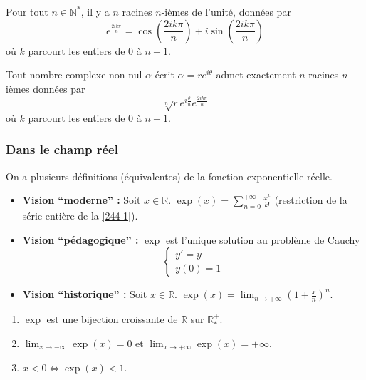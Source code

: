 
  \begin{application}
    Pour tout $n \in \mathbb{N}^*$, il y a $n$ racines $n$-ièmes de l'unité, données par
    \[ e^{\frac{2ik\pi}{n}} = \cos \left( \frac{2ik\pi}{n} \right) + i \sin \left( \frac{2ik\pi}{n} \right) \]
    où $k$ parcourt les entiers de $0$ à $n-1$.
  \end{application}

  \begin{corollary}
    Tout nombre complexe non nul $\alpha$ écrit $\alpha = re^{i\theta}$ admet exactement $n$ racines $n$-ièmes données par
    \[ \sqrt[n]{r} e^{i\frac{\theta}{n}} e^{\frac{2ik\pi}{n}} \]
    où $k$ parcourt les entiers de $0$ à $n-1$.
  \end{corollary}

  \subsubsection{Dans le champ réel}


  \begin{definition}
    On a plusieurs définitions (équivalentes) de la fonction exponentielle réelle.
    \begin{itemize}
      \item \textbf{Vision ``moderne'' :} Soit $x \in \mathbb{R}$. $\exp(x) = \sum_{n=0}^{+\infty} \frac{x^k}{k!}$ (restriction de la série entière de la \cref{244-1}).
      \item \textbf{Vision ``pédagogique'' :} $\exp$ est l'unique solution au problème de Cauchy
      \[
        \begin{cases}
          y' = y \\
          y(0) = 1
        \end{cases}
      \]
      \item \textbf{Vision ``historique'' :} Soit $x \in \mathbb{R}$. $\exp(x) = \lim_{n \rightarrow +\infty} \left( 1 + \frac{x}{n} \right)^n$.
    \end{itemize}
  \end{definition}


  \begin{theorem}
    \begin{enumerate}[label=(\roman*)]
      \item $\exp$ est une bijection croissante de $\mathbb{R}$ sur $\mathbb{R}_*^+$.
      \item $\lim_{x \rightarrow -\infty} \exp(x) = 0$ et $\lim_{x \rightarrow +\infty} \exp(x) = +\infty$.
      \item $x < 0 \iff \exp(x) < 1$.
    \end{enumerate}
  \end{theorem}

